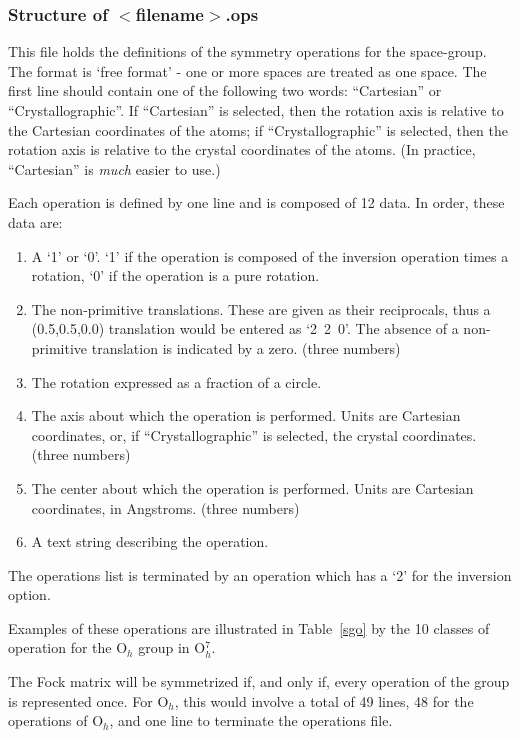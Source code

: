 \subsubsection{Structure of $<$filename$>$.ops}
This file holds the definitions of the symmetry operations for the space-group.
The format is `free format' - one or more spaces are treated as one space. The
first line should contain one of the following two words: ``Cartesian'' or
``Crystallographic''.  If ``Cartesian'' is selected, then the rotation axis is
relative to the Cartesian coordinates of the atoms; if ``Crystallographic'' is
selected, then the rotation axis is relative to the crystal coordinates of the
atoms.  (In practice, ``Cartesian'' is {\em much} easier to use.)

Each operation is defined by one line and is composed of 12 data.
In order, these data are:
\begin{enumerate}
\item A `1' or `0'.  `1' if the operation is composed of the inversion operation times
a rotation, `0' if the operation is a pure rotation.
\item The non-primitive translations.  These are given as their reciprocals, thus
a (0.5,0.5,0.0) translation would be entered as `2~2~0'. The absence of
a non-primitive translation is indicated by a zero. (three numbers)
\item The rotation expressed as a fraction of a circle.
\item The axis about which the operation is performed. Units are
Cartesian coordinates, or, if ``Crystallographic'' is selected, the crystal
coordinates. (three numbers)
\item The center about which the operation is performed. Units are
Cartesian coordinates, in Angstroms. (three numbers)
\item A text string describing the operation.
\end{enumerate}

The operations list is terminated by an operation which has a `2' for the
inversion option.

Examples of these operations are illustrated in Table~\ref{sgo}
by the 10 classes of operation for the O$_h$ group in O$_h^7$.


The Fock matrix will be symmetrized if, and only if, every operation of
the group is represented once.  For O$_h$, this would involve a total of 49
lines, 48 for the operations of O$_h$, and one line to terminate the operations
file.

